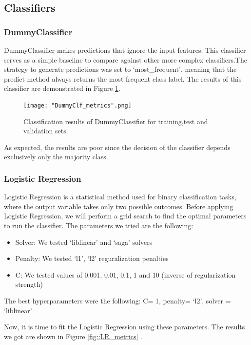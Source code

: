 \documentclass[10pt, a4paper]{article}
\begin{document}
    \subsection{Classifiers}
    \subsubsection{DummyClassifier}
    DummyClassifier makes predictions that ignore the input features. This classifier serves as a simple baseline to compare against other more complex classifiers.The strategy to generate predictions was set to ‘most\_frequent’,  meaning that the predict method always returns the most frequent class label. The results of this classifier are demonstrated in Figure \ref{fig::dummy_metrics}.

    \begin{figure}
	    \centering
            \texttt{[image: "DummyClf\_metrics".png]}
	    \caption{Classification results of DummyClassifier for training,test and validation sets.}
	    \label{fig::dummy_metrics}
    \end{figure}


    As expected, the results are poor since the decision of the classifier depends exclusively only the majority class.

    \subsubsection{Logistic Regression}
    Logistic Regression is a statistical method used for binary classification tasks, where the output variable takes only two possible outcomes.
    Before applying Logistic Regression, we will perform a grid search to find the optimal parameters to run the classifier. The parameters we tried are the following:
    \begin{itemize}
    \item{Solver: We tested ‘liblinear’ and ‘saga’ solvers}
    \item{Penalty: We tested ‘l1’, ‘l2’ reguralization penalties}
    \item{C: We tested values of 0.001, 0.01, 0.1, 1 and 10 (inverse of regularization strength)}
    \end{itemize}

    The best hyperparameters were the following:
    C= 1, penalty= ‘l2’, solver = ‘liblinear’.
    
    Now, it is time to fit the Logistic Regression using these parameters. The results we got are shown in Figure \ref{fig::LR_metrics} .
\end{document}
